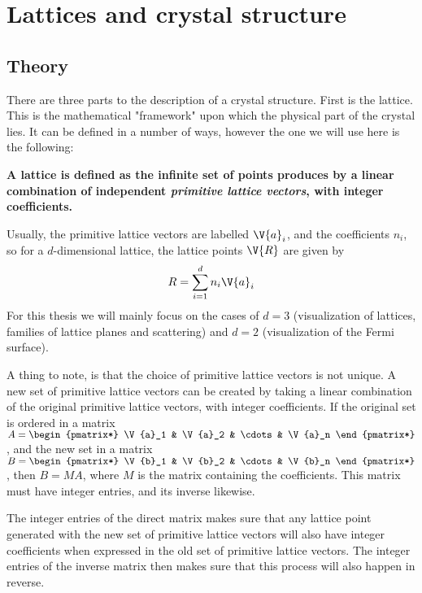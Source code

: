 \documentclass[main.tex]{subfiles}
\begin{document}
	\section{Lattices and crystal structure}
	\subsection{Theory}
	There are three parts to the description of a crystal structure. First is the lattice. This is the mathematical "framework" upon which the physical part of the crystal lies. It can be defined in a number of ways, however the one we will use here is the following:
	
	\textbf{A lattice is defined as the infinite set of points produces by a linear combination of independent \emph{primitive lattice vectors}, with integer coefficients.}
	
	Usually, the primitive lattice vectors are labelled $ \V{a}_i $, and the coefficients $ n_i $, so for a $ d $-dimensional lattice, the lattice points $ \V{R} $ are given by
	\begin{equation}\label{eq:lattice_points}
	R = \sum_{i = 1}^{d} n_i \V{a}_i
	\end{equation}
	For this thesis we will mainly focus on the cases of $ d = 3 $ (visualization of lattices, families of lattice planes and scattering) and $ d = 2 $ (visualization of the Fermi surface).
	
	A thing to note, is that the choice of primitive lattice vectors is not unique. A new set of primitive lattice vectors can be created by taking a linear combination of the original primitive lattice vectors, with integer coefficients. If the original set is ordered in a matrix $ A = \begin{pmatrix*} \V{a}_1 & \V{a}_2 & \cdots & \V{a}_n \end{pmatrix*}$, and the new set in a matrix $ B = \begin{pmatrix*} \V{b}_1 & \V{b}_2 & \cdots & \V{b}_n \end{pmatrix*} $, then $ B = MA $, where $ M $ is the matrix containing the coefficients. This matrix must have integer entries, and its inverse likewise.
	
	The integer entries of the direct matrix makes sure that any lattice point generated with the new set of primitive lattice vectors will also have integer coefficients when expressed in the old set of primitive lattice vectors. The integer entries of the inverse matrix then makes sure that this process will also happen in reverse.
	
\end{document}
